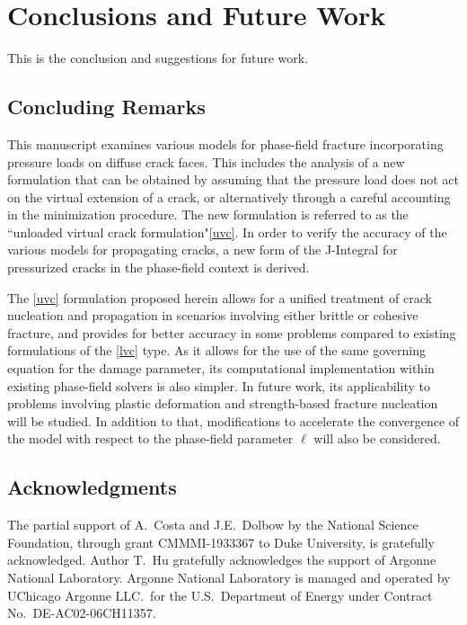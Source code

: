 \chapter{Conclusions and Future Work}
\label{section: Conclusion}

This is the conclusion and suggestions for future work.

\section{Concluding Remarks}

This manuscript examines various models for phase-field fracture incorporating pressure loads on diffuse crack faces.  This includes the analysis of a new formulation that can be obtained by assuming that the pressure load does not act on the virtual extension of a crack, or alternatively through a careful accounting in the minimization procedure. The new formulation is referred to as the 
 ``unloaded virtual crack formulation"\eqref{uvc}. In order to verify the accuracy of the various models for propagating cracks, a new form of the J-Integral for pressurized cracks in the phase-field context is derived.

The \eqref{uvc} formulation proposed herein allows for a unified treatment of crack nucleation and propagation in scenarios involving either brittle or cohesive fracture, and provides for better accuracy in some problems compared to existing formulations of the \eqref{lvc} type. As it allows for the use of the same governing equation for the damage parameter, its computational implementation within existing phase-field solvers is also simpler. In future work, its applicability to problems involving plastic deformation and strength-based fracture nucleation will be studied. In addition to that, modifications to accelerate the convergence of the model with respect to the phase-field parameter $\ell$ will also be considered.

\section{Acknowledgments}

The partial support of A.\ Costa and  J.E.\ Dolbow by the National Science Foundation, through grant CMMMI-1933367 to Duke University, is gratefully acknowledged.  Author T.\ Hu gratefully acknowledges the support of Argonne National Laboratory.  Argonne National Laboratory is managed and operated by UChicago Argonne LLC.\ for the U.S.\ Department of Energy under Contract No.\ DE-AC02-06CH11357.